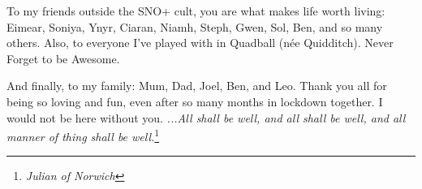 \begin{acknowledgements}
To my friends outside the SNO+ cult, you are what makes life worth living: Eimear, Soniya, Ynyr, Ciaran, Niamh, Steph, Gwen, Sol, Ben, and so many others. Also, to everyone I've played with in Quadball (n\'{e}e Quidditch). Never Forget to be Awesome.

And finally, to my family: Mum, Dad, Joel, Ben, and Leo. Thank you all for being so loving and fun, even after so many months in lockdown together. I would not be here without you. \textit{...All shall be well, and all shall be well, and all manner of thing shall be well.}\footnote{\textit{Julian of Norwich}}

\end{acknowledgements}
